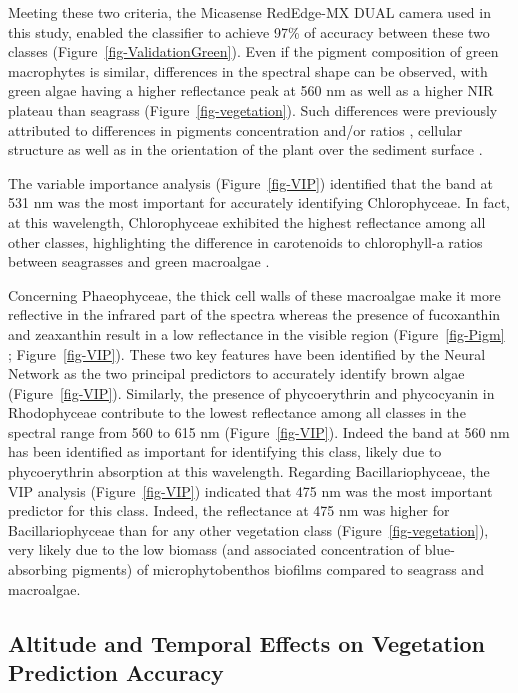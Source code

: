 \documentclass[
  number]{elsarticle}
\begin{document}
Meeting these two criteria, the Micasense RedEdge-MX DUAL camera used in
this study, enabled the classifier to achieve 97\% of accuracy between
these two classes (Figure~\ref{fig-ValidationGreen}). Even if the
pigment composition of green macrophytes is similar, differences in the
spectral shape can be observed, with green algae having a higher
reflectance peak at 560 nm as well as a higher NIR plateau than seagrass
(Figure~\ref{fig-vegetation}). Such differences were previously
attributed to differences in pigments concentration and/or ratios
\citep{bargain2013seasonal}, cellular structure as well as in the
orientation of the plant over the sediment surface \citetext{\citealp[
]{beach1997vivo}; \citealp[
]{kirk1994light}; \citealp{hedley2018influence}}.

The variable importance analysis (Figure~\ref{fig-VIP}) identified that
the band at 531 nm was the most important for accurately identifying
Chlorophyceae. In fact, at this wavelength, Chlorophyceae exhibited the
highest reflectance among all other classes, highlighting the difference
in carotenoids to chlorophyll-a ratios between seagrasses and green
macroalgae \citep{repolho2017seagrass}.

Concerning Phaeophyceae, the thick cell walls of these macroalgae
\citep{charrier2021growth} make it more reflective in the infrared part
of the spectra \citep{Slaton2001} whereas the presence of fucoxanthin
and zeaxanthin result in a low reflectance in the visible region
(Figure~\ref{fig-Pigm} ; Figure~\ref{fig-VIP}). These two key features
have been identified by the Neural Network as the two principal
predictors to accurately identify brown algae (Figure~\ref{fig-VIP}).
Similarly, the presence of phycoerythrin and phycocyanin in Rhodophyceae
contribute to the lowest reflectance among all classes in the spectral
range from 560 to 615 nm (Figure~\ref{fig-VIP}). Indeed the band at 560
nm has been identified as important for identifying this class, likely
due to phycoerythrin absorption at this wavelength. Regarding
Bacillariophyceae, the VIP analysis (Figure~\ref{fig-VIP}) indicated
that 475 nm was the most important predictor for this class. Indeed, the
reflectance at 475 nm was higher for Bacillariophyceae than for any
other vegetation class (Figure~\ref{fig-vegetation}), very likely due to
the low biomass (and associated concentration of blue-absorbing
pigments) of microphytobenthos biofilms compared to seagrass and
macroalgae.

\subsection{Altitude and Temporal Effects on Vegetation Prediction
Accuracy}\label{altitude-and-temporal-effects-on-vegetation-prediction-accuracy}
\end{document}
